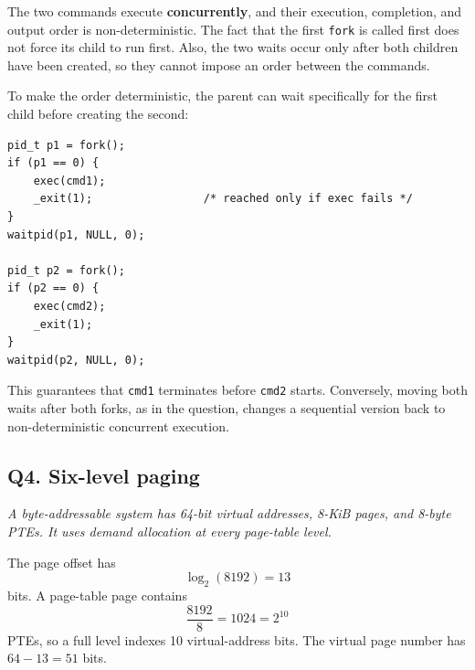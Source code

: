 \begin{enumerate}
The two commands execute \textbf{concurrently}, and their execution,
completion, and output order is non-deterministic.  The fact that the first
\texttt{fork} is called first does not force its child to run first.  Also,
the two waits occur only after both children have been created, so they
cannot impose an order between the commands.

To make the order deterministic, the parent can wait specifically for the
first child before creating the second:

\begin{verbatim}
pid_t p1 = fork();
if (p1 == 0) {
    exec(cmd1);
    _exit(1);                 /* reached only if exec fails */
}
waitpid(p1, NULL, 0);

pid_t p2 = fork();
if (p2 == 0) {
    exec(cmd2);
    _exit(1);
}
waitpid(p2, NULL, 0);
\end{verbatim}

This guarantees that \texttt{cmd1} terminates before \texttt{cmd2} starts.
Conversely, moving both waits after both forks, as in the question, changes
a sequential version back to non-deterministic concurrent execution.
\end{enumerate}

\subsection*{Q4. Six-level paging}

\emph{A byte-addressable system has 64-bit virtual addresses, 8-KiB pages,
and 8-byte PTEs.  It uses demand allocation at every page-table level.}

The page offset has
\[
 \log_2(8192)=13
\]
bits.  A page-table page contains
\[
 \frac{8192}{8}=1024=2^{10}
\]
PTEs, so a full level indexes 10 virtual-address bits.  The virtual page
number has \(64-13=51\) bits.

